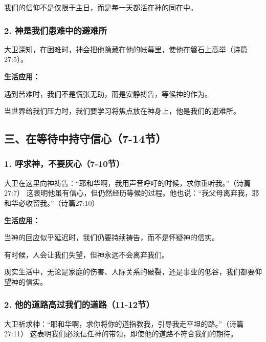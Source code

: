\documentclass[a4paper, 12pt]{article}
\begin{document}
\hspace{0.6cm}我们的信仰不是仅限于主日，而是每一天都活在神的同在中。


\subsubsection*{2. 神是我们患难中的避难所}
\hspace{0.6cm}大卫深知，在困难时，神会把他隐藏在他的帐幕里，使他在磐石上高举（诗篇27:5）。

\vspace{0.2cm}

\textbf{生活应用：}

\hspace{0.6cm}遇到苦难时，我们不是慌张无助，而是安静祷告，等候神的作为。

\hspace{0.6cm}当世界给我们压力时，我们要学习将焦点放在神身上，他是我们的避难所。




\subsection*{三、在等待中持守信心（7-14节）}
\subsubsection*{1. 呼求神，不要灰心（7-10节）}
\hspace{0.6cm}大卫在这里向神祷告：“耶和华啊，我用声音呼吁的时候，求你垂听我。”（诗篇27:7） 这表明他虽有信心，但仍然经历等候的过程。他也说：“我父母离弃我，耶和华必收留我。”（诗篇27:10）

\textbf{生活应用：}

\vspace{0.2cm}

\hspace{0.6cm}当神的回应似乎延迟时，我们仍要持续祷告，而不是怀疑神的信实。

\hspace{0.6cm}有时候，人会让我们失望，但神永远不会离弃我们。

\hspace{0.6cm}现实生活中，无论是家庭的伤害、人际关系的破裂，还是事业的低谷，我们都要仰望神的信实。

\subsubsection*{2. 他的道路高过我们的道路（11-12节）}
\hspace{0.6cm}大卫祈求神：“耶和华啊，求你将你的道指教我，引导我走平坦的路。”（诗篇27:11） 这表明我们必须信任神的带领，即使他的道路不符合我们的期待。
\end{document}
